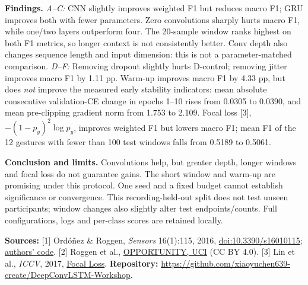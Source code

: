 \documentclass[10pt,a4paper]{article}
\begin{document}
\textbf{Findings.}
\textit{A--C:} CNN slightly improves weighted F1 but reduces macro F1; GRU improves both with fewer parameters. Zero convolutions sharply hurts macro F1, while one/two layers outperform four. The 20-sample window ranks highest on both F1 metrics, so longer context is not consistently better. Conv depth also changes sequence length and input dimension: this is not a parameter-matched comparison.
\textit{D--F:} Removing dropout slightly hurts D-control; removing jitter improves macro F1 by 1.11 pp. Warm-up improves macro F1 by 4.33 pp, but does \emph{not} improve the measured early stability indicators: mean absolute consecutive validation-CE change in epochs 1--10 rises from 0.0305 to 0.0390, and mean pre-clipping gradient norm from 1.753 to 2.109. Focal loss [3], $-(1-p_y)^2\log p_y$, improves weighted F1 but lowers macro F1; mean F1 of the 12 gestures with fewer than 100 test windows falls from 0.5189 to 0.5061.

\textbf{Conclusion and limits.}
Convolutions help, but greater depth, longer windows and focal loss do not guarantee gains. The short window and warm-up are promising under this protocol. One seed and a fixed budget cannot establish significance or convergence. This recording-held-out split does not test unseen participants; window changes also slightly alter test endpoints/counts. Full configurations, logs and per-class scores are retained locally.

{\footnotesize
\textbf{Sources:} [1] Ord\'o\~nez \& Roggen, \emph{Sensors} 16(1):115, 2016, \href{https://doi.org/10.3390/s16010115}{doi:10.3390/s16010115}; \href{https://github.com/STRCWearlab/DeepConvLSTM}{authors' code}.
[2] Roggen et al., \href{https://doi.org/10.24432/C5M027}{OPPORTUNITY, UCI} (CC BY 4.0).
[3] Lin et al., \emph{ICCV}, 2017, \href{https://doi.org/10.1109/ICCV.2017.324}{Focal Loss}.
\textbf{Repository:} \url{https://github.com/xiaoyuchen639-create/DeepConvLSTM-Workshop}.
}
\end{document}
